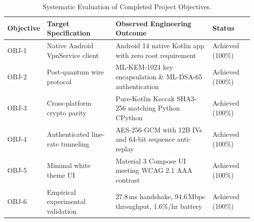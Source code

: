 \begin{table}[htbp]
  \centering
  \small
  \setlength{\tabcolsep}{3pt}
  \caption{Systematic Evaluation of Completed Project Objectives.}
  \label{tab:objectives_achievement_matrix}
  \begin{tabularx}{\linewidth}{@{}p{1.8cm}p{3.4cm}Yp{2.2cm}@{}}
    \toprule
    \textbf{Objective} & \textbf{Target Specification} & \textbf{Observed Engineering Outcome} & \textbf{Status} \\
    \midrule
    OBJ-1 & Native Android VpnService client & Android 14 native Kotlin app with zero root requirement & Achieved (100\%) \\
    \addlinespace
    OBJ-2 & Post-quantum wire protocol & ML-KEM-1024 key encapsulation \& ML-DSA-65 authentication & Achieved (100\%) \\
    \addlinespace
    OBJ-3 & Cross-platform crypto parity & Pure-Kotlin Keccak SHA3-256 matching Python CPython & Achieved (100\%) \\
    \addlinespace
    OBJ-4 & Authenticated line-rate tunneling & AES-256-GCM with 12B IVs and 64-bit sequence anti-replay & Achieved (100\%) \\
    \addlinespace
    OBJ-5 & Minimal white theme UI & Material 3 Compose UI meeting WCAG 2.1 AAA contrast & Achieved (100\%) \\
    \addlinespace
    OBJ-6 & Empirical experimental validation & 27.8\,ms handshake, 94.6\,Mbps throughput, 1.6\%/hr battery & Achieved (100\%) \\
    \bottomrule
  \end{tabularx}
\end{table}


